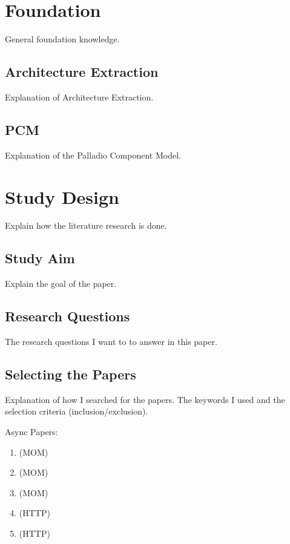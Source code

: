 
\section{Foundation}
\label{ch:Foundation}

General foundation knowledge.

\subsection{Architecture Extraction}
\label{sec:FirstContentSection:FirstSubSubSection}
Explanation of Architecture Extraction.

\subsection{PCM}
\label{sec:FirstContentSection:FirstSubSection}
Explanation of the Palladio Component Model.

\section{Study Design}
\label{sec:SecondContentSection:FirstSubsection}
Explain how the literature research is done.

\subsection{Study Aim}
\label{sec:SecondContentSection:SecondSubsection}
Explain the goal of the paper.

\subsection{Research Questions}
The research questions I want to to answer in this paper.

\subsection{Selecting the Papers}
Explanation of how I searched for the papers. The keywords I used and the selection criteria (inclusion/exclusion).

Async Papers:
\begin{enumerate}
	\item \cite{Singh2022} (MOM)
	\item \cite{Alshuqayran2018} (MOM)
	\item \cite{Brosig2011} (MOM)
	\item \cite{Mayer2018} (HTTP)
	\item \cite{Kleehaus2018} (HTTP)
\end{enumerate}

